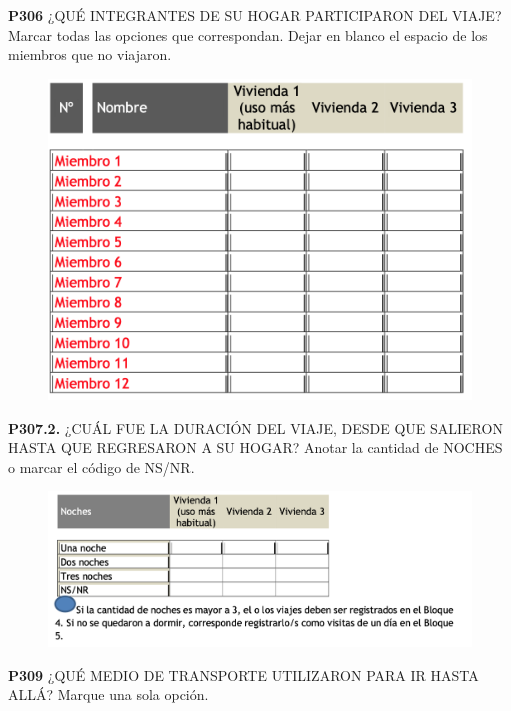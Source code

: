 \documentclass[
  openany]{book}
\begin{document}
\textbf{P306} ¿QUÉ INTEGRANTES DE SU HOGAR PARTICIPARON DEL VIAJE?
Marcar todas las opciones que correspondan. Dejar en blanco el espacio de los miembros que no viajaron.

\begin{figure}

{\centering \includegraphics[width=1\linewidth]{imagenes/figura6-162} 

}

\end{figure}

\textbf{P307.2.} ¿CUÁL FUE LA DURACIÓN DEL VIAJE, DESDE QUE SALIERON HASTA QUE REGRESARON A SU HOGAR?
Anotar la cantidad de NOCHES o marcar el código de NS/NR.

\begin{figure}

{\centering \includegraphics[width=1\linewidth]{imagenes/figura6-163} 

}

\end{figure}

\textbf{P309} ¿QUÉ MEDIO DE TRANSPORTE UTILIZARON PARA IR HASTA ALLÁ?
Marque una sola opción.
\end{document}
